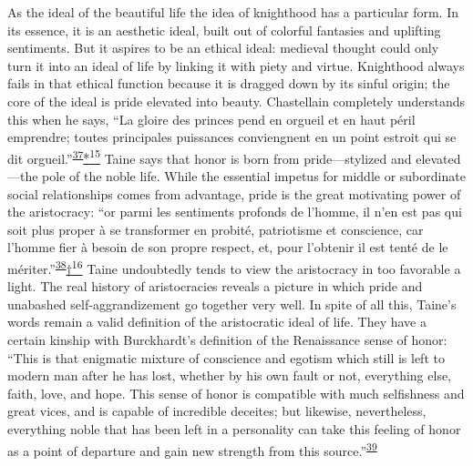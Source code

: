 As the ideal of the beautiful life the idea of knighthood has a
particular form. In its essence, it is an aesthetic ideal, built out of
colorful fantasies and uplifting sentiments. But it aspires to be an
ethical ideal: medieval thought could only turn it into an ideal of life
by linking it with piety and virtue. Knighthood always fails in that
ethical function because it is dragged down by its sinful origin; the
core of the ideal is pride elevated into beauty. Chastellain completely
understands this when he says, ``La gloire des princes pend en orgueil
et en haut péril emprendre; toutes principales puissances conviengnent
en un point estroit qui se dit
orgueil.''\textsuperscript{\protect\hypertarget{10_Chapter_Three__THE_HEROIC_DREAM.xhtmlux5cux23id_1859}{\protect\hyperlink{23_NOTES.xhtmlux5cux23id_1860}{37}}}\protect\hypertarget{10_Chapter_Three__THE_HEROIC_DREAM.xhtmlux5cux23id_2491}{\protect\hyperlink{23_NOTES.xhtmlux5cux23id_2492}{*\textsuperscript{15}}}
Taine says that honor is born from pride---stylized and elevated---the
pole of the noble life. While the essential impetus for middle or
subordinate social relationships comes from advantage, pride is the
great motivating power of the aristocracy: ``or parmi les sentiments
profonds de l'homme, il n'en est pas qui soit plus proper à se
transformer en probité, patriotisme et conscience, car l'homme fier à
besoin de son propre respect, et, pour l'obtenir il est tenté de le
mériter.''\textsuperscript{\protect\hypertarget{10_Chapter_Three__THE_HEROIC_DREAM.xhtmlux5cux23id_1857}{\protect\hyperlink{23_NOTES.xhtmlux5cux23id_1858}{38}}}\protect\hypertarget{10_Chapter_Three__THE_HEROIC_DREAM.xhtmlux5cux23id_2493}{\protect\hyperlink{23_NOTES.xhtmlux5cux23id_2494}{†\textsuperscript{16}}}
Taine undoubtedly tends to view the aristocracy in too favorable a
light. The real history of aristocracies reveals a picture in which
pride and unabashed self-aggrandizement go together very well. In spite
of all this, Taine's words remain a valid definition of the aristocratic
ideal of life. They have a certain kinship with Burckhardt's definition
of the Renaissance sense of honor: ``This is that enigmatic mixture of
conscience and egotism which still is left to modern man after he has
lost, whether by his own fault or not, everything else, faith, love, and
hope. This sense of honor is compatible with much selfishness and great
vices, and is capable of incredible deceites; but likewise,
nevertheless, everything noble that has been left in a personality can
take this feeling of honor as a point of departure and gain new strength
from this
source.''\textsuperscript{\protect\hypertarget{10_Chapter_Three__THE_HEROIC_DREAM.xhtmlux5cux23id_1855}{\protect\hyperlink{23_NOTES.xhtmlux5cux23id_1856}{39}}}


